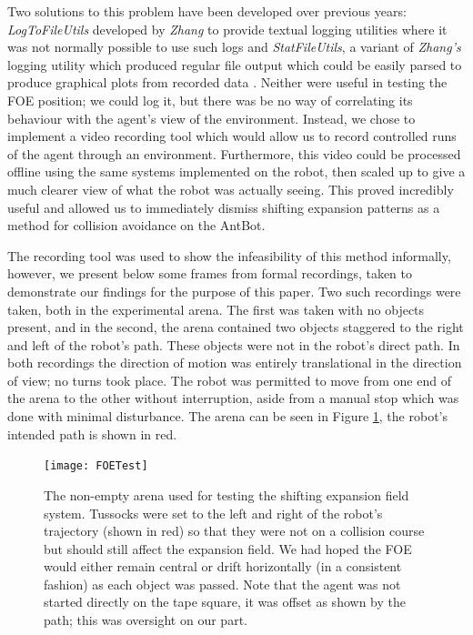 \documentclass[a4paper,11pt,twoside,openright]{article}
\begin{document}
Two solutions to this problem have been developed over previous years:
\textit{LogToFileUtils} developed by \textit{Zhang} to provide textual
logging utilities where it was not normally possible to use such logs
\cite{Zhang2017} and \textit{StatFileUtils}, a variant of
\textit{Zhang's} logging utility which produced regular file output
which could be easily parsed to produce graphical plots from recorded
data \cite{Mitchell2018}. Neither were useful in testing the FOE
position; we could log it, but there was be no way of correlating its
behaviour with the agent's view of the environment. Instead, we chose
to implement a video recording tool which would allow us to record
controlled runs of the agent through an environment. Furthermore, this
video could be processed offline using the same systems implemented on
the robot, then scaled up to give a much clearer view of what the
robot was actually seeing.  This proved incredibly useful and allowed
us to immediately dismiss shifting expansion patterns as a method for
collision avoidance on the AntBot.
\newline\par

The recording tool was used to show the infeasibility of this method
informally, however, we present below some frames from formal
recordings, taken to demonstrate our findings for the purpose of this
paper. Two such recordings were taken, both in the experimental
arena. The first was taken with no objects present, and in the second, the
arena contained two objects staggered to the right and left of the
robot's path. These objects were not in the robot's direct path.
In both recordings the direction of motion was entirely
translational in the direction of view; no turns took place. The robot
was permitted to move from one end of the arena to the other without
interruption, aside from a manual stop which was done with minimal
disturbance. The arena can be seen in Figure \ref{fig:foetest}, the
robot's intended path is shown in red.

\begin{figure}[h!]
  \centering
  \texttt{[image: FOETest]}
  \caption{\label{fig:foetest} The non-empty arena used for testing
    the shifting expansion field system. Tussocks were set to the left
    and right of the robot's trajectory (shown in red) so that they
    were not on a collision course but should still affect the
    expansion field. We had hoped the FOE would either remain central
    or drift horizontally (in a consistent fashion) as each object was
    passed. Note that the agent was not started directly on the tape
    square, it was offset as shown by the path; this was oversight on
    our part.  }
\end{figure}
\end{document}

